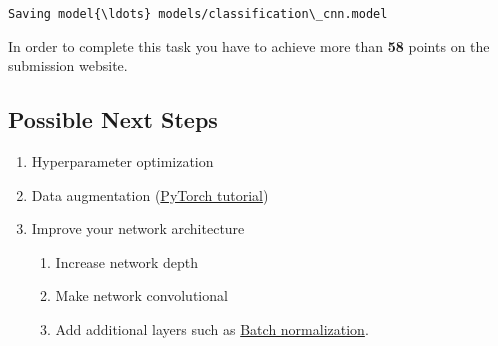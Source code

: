 \documentclass[11pt]{article}
\providecommand{\tightlist}{%
      \setlength{\itemsep}{0pt}\setlength{\parskip}{0pt}}
\begin{document}
    \begin{Verbatim}[commandchars=\\\{\}]
Saving model{\ldots} models/classification\_cnn.model

    \end{Verbatim}

    In order to complete this task you have to achieve more than \textbf{58}
points on the submission website.

    \subsection{Possible Next Steps}\label{possible-next-steps}

\begin{enumerate}
\def\labelenumi{\arabic{enumi}.}
\tightlist
\item
  Hyperparameter optimization
\item
  Data augmentation
  (\href{http://pytorch.org/tutorials/beginner/data_loading_tutorial.html}{PyTorch
  tutorial})
\item
  Improve your network architecture

  \begin{enumerate}
  \def\labelenumii{\arabic{enumii}.}
  \tightlist
  \item
    Increase network depth
  \item
    Make network convolutional
  \item
    Add additional layers such as
    \href{https://gab41.lab41.org/batch-normalization-what-the-hey-d480039a9e3b\#}{Batch
    normalization}.
  \end{enumerate}
\end{enumerate}


    
    
    
    
\end{document}
